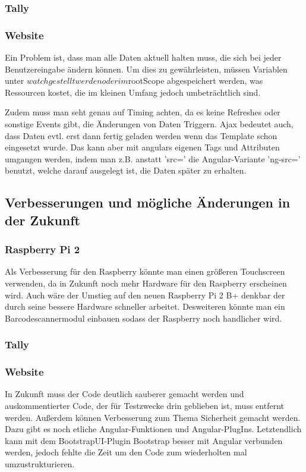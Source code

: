 \documentclass[11pt,a4paper]{article} %
\begin{document}
\subsubsection{Tally}


\subsubsection{Website}
Ein Problem ist, dass man alle Daten aktuell halten muss, die sich bei jeder Benutzereingabe ändern können.
Um dies zu gewährleisten, müssen Variablen unter $watch gestellt werden oder im $rootScope abgespeichert werden, was Ressourcen kostet, die im kleinen Umfang jedoch umbeträchtlich sind.
\par
Zudem muss man seht genau auf Timing achten, da es keine Refreshes oder sonstige Events gibt, die Änderungen von Daten Triggern. Ajax bedeutet auch, dass Daten evtl. erst dann fertig geladen werden wenn das Template schon eingesetzt wurde. Das kann aber mit angulars eigenen Tags und Attributen umgangen werden, indem man z.B. anstatt 'src=' die Angular-Variante 'ng-src=' benutzt, welche darauf ausgelegt ist, die Daten später zu erhalten.

\subsection{Verbesserungen und mögliche Änderungen in der Zukunft}

\subsubsection{Raspberry Pi 2}
Als Verbesserung für den Raspberry könnte man einen größeren Touchscreen verwenden, da in Zukunft noch mehr Hardware für den Raspberry erscheinen wird. Auch wäre der Umstieg auf den neuen Raspberry Pi 2 B+ denkbar der durch seine bessere Hardware schneller arbeitet. Desweiteren könnte man ein Barcodescannermodul einbauen sodass der Raspberry noch handlicher wird.

\subsubsection{Tally}

\subsubsection{Website}
In Zukunft muss der Code deutlich sauberer gemacht werden und auskommentierter Code, der für Testzwecke drin geblieben ist, muss entfernt werden. Außerdem können Verbesserung zum Thema Sicherheit gemacht werden. Dazu gibt es noch etliche Angular-Funktionen und Angular-PlugIns. Letztendlich kann mit dem BootstrapUI-Plugin Bootstrap besser mit Angular verbunden werden, jedoch fehlte die Zeit um den Code zum wiederholten mal umzustrukturieren.

\newpage
\newpage
\begin{center}


\end{center}
\end{document}
